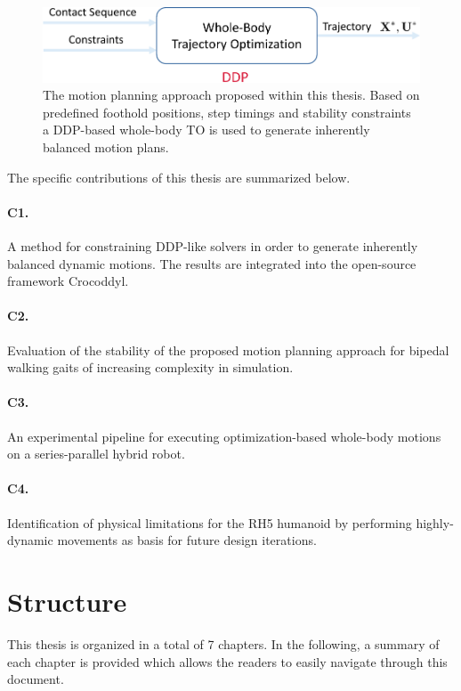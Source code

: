 \begin{figure}
\centering	
\includegraphics[width=.8\textwidth]{img/approach}
\caption[Overall motion planning approach proposed within this thesis]{The motion planning approach proposed within this thesis. Based on predefined foothold positions, step timings and stability constraints a \gls{DDP}-based whole-body \gls{TO} is used to generate inherently balanced motion plans.}
\label{img:approach}
\end{figure}

The specific contributions of this thesis are summarized below.

\paragraph{C1.} A method for constraining DDP-like solvers in order to generate inherently balanced dynamic motions. The results are integrated into the open-source framework Crocoddyl.
\paragraph{C2.} Evaluation of the stability of the proposed motion planning approach for bipedal walking gaits of increasing complexity in simulation.
\paragraph{C3.} An experimental pipeline for executing optimization-based whole-body motions on a series-parallel hybrid robot.
\paragraph{C4.} Identification of physical limitations for the RH5 humanoid by performing highly-dynamic movements as basis for future design iterations.   

\section{Structure}
This thesis is organized in a total of 7 chapters. 
In the following, a summary of each chapter is provided which allows the readers to easily navigate through this document.

